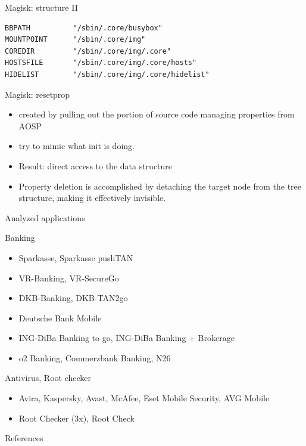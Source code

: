\documentclass[
    11pt,%
    aspectratio=169,%
]{beamer}
\begin{document}
\begin{frame}[fragile]{Magisk: structure II}
\begin{verbatim}
BBPATH          "/sbin/.core/busybox"
MOUNTPOINT      "/sbin/.core/img"
COREDIR         "/sbin/.core/img/.core"
HOSTSFILE       "/sbin/.core/img/.core/hosts"
HIDELIST        "/sbin/.core/img/.core/hidelist"
\end{verbatim}
\end{frame}

\begin{frame}{Magisk: resetprop}
\begin{itemize}
  \item created by pulling out the portion of source code managing properties from AOSP
  \item try to mimic what init is doing.
  \item Result: direct access to the data structure
  \item Property deletion is accomplished by detaching the target node from the tree structure, making it effectively invisible.
\end{itemize}
\end{frame}



\begin{frame}[fragile]{Analyzed applications}
\begin{exampleblock}{Banking}
\begin{itemize}
\item Sparkasse, Sparkasse pushTAN
\item VR-Banking, VR-SecureGo
\item DKB-Banking, DKB-TAN2go
\item Deutsche Bank Mobile
\item ING-DiBa Banking to go, ING-DiBa Banking + Brokerage
\item o2 Banking, Commerzbank Banking, N26
\end{itemize}
\end{exampleblock}
\begin{exampleblock}{Antivirus, Root checker}
\begin{itemize}
\item Avira, Kaspersky, Avast, McAfee, Eset Mobile Security, AVG Mobile
\item Root Checker (3x), Root Check
\end{itemize}
\end{exampleblock}
\end{frame}



\begin{frame}[allowframebreaks]{References}

  
  

\end{frame}
\end{document}
